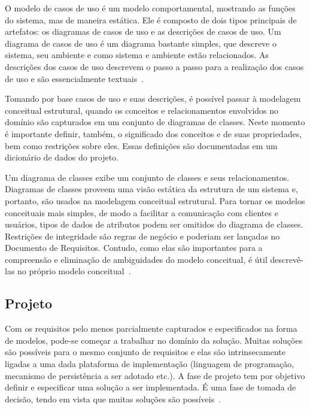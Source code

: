 O modelo de casos de uso é um modelo comportamental, mostrando as funções do sistema, mas de maneira estática. Ele é composto de dois tipos principais de artefatos: os diagramas de casos de uso e as descrições de casos de uso. Um diagrama de casos de uso é um diagrama bastante simples, que descreve o sistema, seu ambiente e como sistema e ambiente estão relacionados. As descrições dos casos de uso descrevem o passo a passo para a realização dos casos de uso e são essencialmente textuais~\cite{falboEngReq}. 

Tomando por base casos de uso e suas descrições, é possível passar à modelagem conceitual estrutural, quando os conceitos e relacionamentos envolvidos no domínio são capturados em um conjunto de diagramas de classes. Neste momento é importante definir, também, o significado dos conceitos e de suas propriedades, bem como restrições sobre eles. Essas definições são documentadas em um dicionário de dados do projeto.

Um diagrama de classes exibe um conjunto de classes e seus relacionamentos. Diagramas de classes proveem uma visão estática da estrutura de um sistema e, portanto, são usados na modelagem conceitual estrutural. Para tornar os modelos conceituais mais simples, de modo a facilitar a comunicação com clientes e usuários, tipos de dados de atributos podem ser omitidos do diagrama de classes. Restrições de integridade são regras de negócio e poderiam ser lançadas no Documento de Requisitos. Contudo, como elas são importantes para a compreensão e eliminação de ambiguidades do modelo conceitual, é útil descrevê-las no próprio modelo conceitual~\cite{falboEngReq}. 





\subsection{Projeto}
\label{sec-referencial-engenharia-software-atividade-desenvolvimento-projeto}

Com os requisitos pelo menos parcialmente capturados e especificados na forma de modelos, pode-se começar a trabalhar no domínio da solução. Muitas soluções são possíveis para o mesmo conjunto de requisitos e elas são intrinsecamente ligadas a uma dada plataforma de implementação (linguagem de programação, mecanismo de persistência a ser adotado etc.). A fase de projeto tem por objetivo definir e especificar uma solução a ser implementada. É uma fase de tomada de decisão, tendo em vista que muitas soluções são possíveis~\cite{falboEngReq}.


